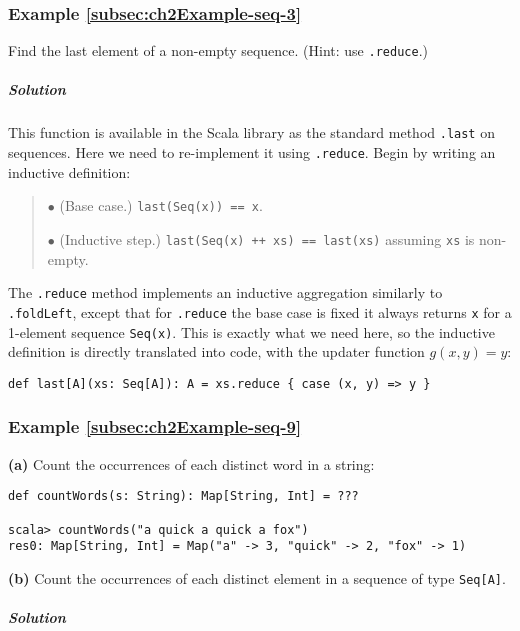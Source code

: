 \subsubsection{Example \label{subsec:ch2Example-seq-3}\ref{subsec:ch2Example-seq-3}}

Find the last element of a non-empty sequence. (Hint: use \lstinline!.reduce!.)

\subparagraph{Solution}

This function is available in the Scala library as the standard method
\lstinline!.last! on sequences. Here we need to re-implement it using
\lstinline!.reduce!. Begin by writing an inductive definition:
\begin{quotation}
$\bullet$ (Base case.) \lstinline!last(Seq(x)) == x!.

$\bullet$ (Inductive step.) \lstinline!last(Seq(x) ++ xs) == last(xs)!
assuming \lstinline!xs! is non-empty.
\end{quotation}
The \lstinline!.reduce! method implements an inductive aggregation
similarly to \lstinline!.foldLeft!, except that for \lstinline!.reduce!
the base case is fixed \textendash{} it always returns \lstinline!x!
for a 1-element sequence \lstinline!Seq(x)!. This is exactly what
we need here, so the inductive definition is directly translated into
code, with the updater function $g(x,y)=y$:
\begin{lstlisting}
def last[A](xs: Seq[A]): A = xs.reduce { case (x, y) => y }
\end{lstlisting}


\subsubsection{Example \label{subsec:ch2Example-seq-9}\ref{subsec:ch2Example-seq-9}}

\textbf{(a)} Count the occurrences of each distinct word in a string:
\begin{lstlisting}
def countWords(s: String): Map[String, Int] = ???

scala> countWords("a quick a quick a fox")
res0: Map[String, Int] = Map("a" -> 3, "quick" -> 2, "fox" -> 1)
\end{lstlisting}
\textbf{(b)} Count the occurrences of each distinct element in a sequence
of type \lstinline!Seq[A]!.

\subparagraph{Solution}

